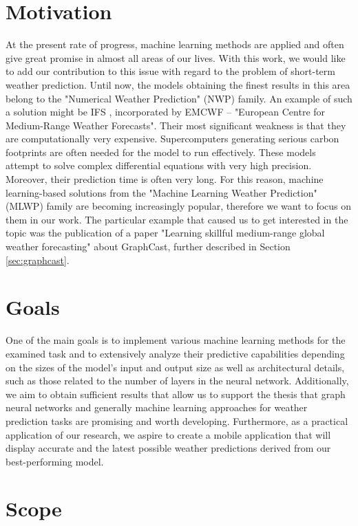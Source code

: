 \section{Motivation}
At the present rate of progress, machine learning methods are applied and often give great promise in almost all areas of our lives. With this work, we would like to add our contribution to this issue with regard to the problem of short-term weather prediction. Until now, the models obtaining the finest results in this area belong to the "Numerical Weather Prediction" (NWP) family. An example of such a solution might be IFS \cite{ECMWFIFS}, incorporated by EMCWF -- "European Centre for Medium-Range Weather Forecasts". Their most significant weakness is that they are computationally very expensive. Supercomputers generating serious carbon footprints are often needed for the model to run effectively. These models attempt to solve complex differential equations with very high precision. Moreover, their prediction time is often very long. 
For this reason, machine learning-based solutions from the "Machine Learning Weather Prediction" (MLWP) family are becoming increasingly popular, therefore we want to focus on them in our work. The particular example that caused us to get interested in the topic was the publication of a paper "Learning skillful medium-range global weather forecasting" \cite{lam2023graphcast} about GraphCast, further described in Section \ref{sec:graphcast}. 

\section{Goals}
One of the main goals is to implement various machine learning methods for the examined task and to extensively analyze their predictive capabilities depending on the sizes of the model's input and output size as well as architectural details, such as those related to the number of layers in the neural network. Additionally, we aim to obtain sufficient results that allow us to support the thesis that graph neural networks and generally machine learning approaches for weather prediction tasks are promising and worth developing. Furthermore, as a practical application of our research, we aspire to create a mobile application that will display accurate and the latest possible weather predictions derived from our best-performing model.

\section{Scope}
